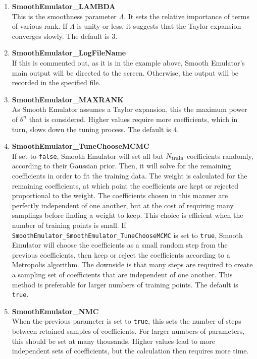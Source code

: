 \documentclass[main.tex]{subfiles}
\begin{document}
\begin{enumerate}\itemsep 0pt
\item {\bf SmoothEmulator\_LAMBDA}\\
This is the smoothness parameter $\Lambda$. It sets the relative importance of terms of various rank. If $\Lambda$ is unity or less, it suggests that the Taylor expansion converges slowly. The default is 3.

\item {\bf SmoothEmulator\_LogFileName}\\
If this is commented out, as it is in the example above, Smooth Emulator's main output will be directed to the screen. Otherwise, the output will be recorded in the specified file.
\item {\bf SmoothEmulator\_MAXRANK}\\
As Smooth Emulator assumes a Taylor expansion, this the maximum power of $\theta^n$ that is considered. Higher values require more coefficients, which in turn, slows down the tuning process. The default is 4.
\item {\bf SmoothEmulator\_TuneChooseMCMC}\\
If set to {\tt false}, Smooth Emulator will set all but $N_{\rm train}$ coefficients randomly, according to their Gaussian prior. Then, it will solve for the remaining coefficients in order to fit the training data. The weight is calculated for the remaining coefficients, at which point the coefficients are kept or rejected proportional to the weight. The coefficients chosen in this manner are perfectly independent of one another, but at the cost of requiring many samplings before finding a weight to keep. This choice is efficient when the number of training points is small. If {\tt SmoothEmulator\_SmoothEmulator\_TuneChooseMCMC} is set to {\tt true}, Smooth Emulator will choose the coefficients as a small random step from the previous coefficients, then keep or reject the coefficients according to a Metropolis algorithm. The downside is that many steps are required to create a sampling set of coefficients that are independent of one another. This method is preferable for larger numbers of training points.  The default is {\tt true}.
\item {\bf SmoothEmulator\_NMC}\\
When the previous parameter is set to {\tt true}, this sets the number of steps between retained samples of coefficients. For larger numbers of parameters, this should be set at many thousands. Higher values lead to more independent sets of coefficients, but the calculation then requires more time. 

\end{enumerate}
\end{document}
